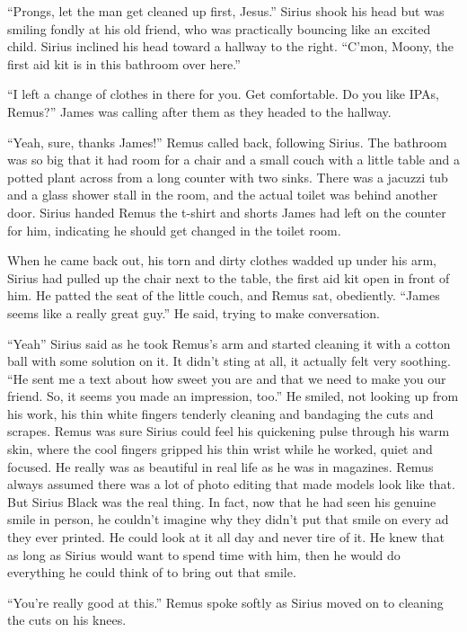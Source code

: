 \documentclass[12pt,twoside,openright]{memoir}
\begin{document}
``Prongs, let the man get cleaned up first, Jesus.'' Sirius shook his head but was smiling fondly at his old friend, who was practically bouncing like an excited child. Sirius inclined his head toward a hallway to the right. ``C'mon, Moony, the first aid kit is in this bathroom over here.''

``I left a change of clothes in there for you. Get comfortable. Do you like IPAs, Remus?'' James was calling after them as they headed to the hallway.

``Yeah, sure, thanks James!'' Remus called back, following Sirius. The bathroom was so big that it had room for a chair and a small couch with a little table and a potted plant across from a long counter with two sinks. There was a jacuzzi tub and a glass shower stall in the room, and the actual toilet was behind another door. Sirius handed Remus the t-shirt and shorts James had left on the counter for him, indicating he should get changed in the toilet room.

When he came back out, his torn and dirty clothes wadded up under his arm, Sirius had pulled up the chair next to the table, the first aid kit open in front of him. He patted the seat of the little couch, and Remus sat, obediently.
``James seems like a really great guy.'' He said, trying to make conversation.

``Yeah'' Sirius said as he took Remus's arm and started cleaning it with a cotton ball with some solution on it. It didn't sting at all, it actually felt very soothing. ``He sent me a text about how sweet you are and that we need to make you our friend. So, it seems you made an impression, too.'' He smiled, not looking up from his work, his thin white fingers tenderly cleaning and bandaging the cuts and scrapes. Remus was sure Sirius could feel his quickening pulse through his warm skin, where the cool fingers gripped his thin wrist while he worked, quiet and focused. He really was as beautiful in real life as he was in magazines. Remus always assumed there was a lot of photo editing that made models look like that. But Sirius Black was the real thing. In fact, now that he had seen his genuine smile in person, he couldn't imagine why they didn't put that smile on every ad they ever printed. He could look at it all day and never tire of it. He knew that as long as Sirius would want to spend time with him, then he would do everything he could think of to bring out that smile.

``You're really good at this.'' Remus spoke softly as Sirius moved on to cleaning the cuts on his knees.
\end{document}
